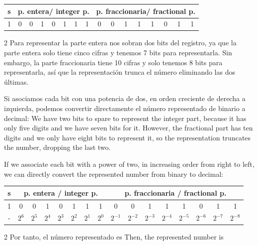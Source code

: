 \begin{center}
\begin{tabular}{|c||c|c|c|c|c|c|c||c|c|c|c|c|c|c|c|}
\hline
s&\multicolumn{7}{c||}{p. entera/ integer p.}&\multicolumn{8}{c|}{p. fraccionaria/ fractional p.}\\
\hline
1&0&0&1&0&1&1&1&0&0&1&1&1&0&1&1\\
\hline
\end{tabular}
\end{center}

\begin{paracol}{2}
Para representar la parte entera nos sobran dos bits del registro, ya que la parte entera solo tiene cinco cifras y tenemos 7 bits para representarla. Sin embargo, la parte fraccionaria tiene 10 cifras y solo tenemos 8 bits para representarla, así que la representación trunca el número eliminando las dos últimas.

Si asociamos cada bit con una potencia de dos, en orden creciente de derecha a izquierda, podemos convertir directamente el número representado de binario a decimal:
\switchcolumn
We have two bits to spare to represent the integer part, because it has only five digits and we have seven bits for it. However, the fractional part has ten digits and we only have eight bits to represent it, so the representation truncates the number, dropping the last two.

If we associate each bit with a power of two, in increasing order from right to left, we can directly convert the represented number from binary to decimal:
\end{paracol}

\begin{center}
\begin{tabular}{|c||c|c|c|c|c|c|c||c|c|c|c|c|c|c|c|}
\hline
s&\multicolumn{7}{c||}{p. entera / integer p.}&\multicolumn{8}{c|}{p. fraccionaria / fractional p. }\\
\hline
1&0&0&1&0&1&1&1&0&0&1&1&1&0&1&1\\
\hline
-&$2^{6}$&$2^{5}$&$2^{4}$&$2^{3}$&$2^{2}$&$2^{1}$&$2^{0}$&$2^{-1}$&$2^{-2}$&$2^{-3}$&$2^{-4}$&$2^{-5}$&$2^{-6}$&$2^{-7}$&$2^{-8}$\\
\hline
\end{tabular}
\end{center}

\begin{paracol}{2}
Por tanto, el número representado es
\switchcolumn
Then, the represented number is
\end{paracol}

